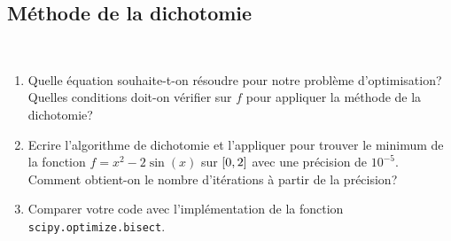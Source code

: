 \subsection{Méthode de la dichotomie}\label{exo:1}

\begin{td-exo}\,
    \begin{enumerate}
        \item Quelle équation souhaite-t-on résoudre pour notre problème d'optimisation?
        Quelles conditions doit-on vérifier sur \(f\) pour appliquer la méthode de la dichotomie?
    
        \item Ecrire l'algorithme de dichotomie et l'appliquer pour trouver le minimum de la fonction
        \(f = x^2 - 2\sin(x)\) sur \(\mathopen{}\left[0,2\right]\mathclose{}\) avec une précision de \(10^{-5}\).
        Comment obtient-on le nombre d'itérations à partir de la précision?
    
        \item Comparer votre code avec l'implémentation de la fonction \texttt{scipy.optimize.bisect}.
    \end{enumerate}
\end{td-exo}

